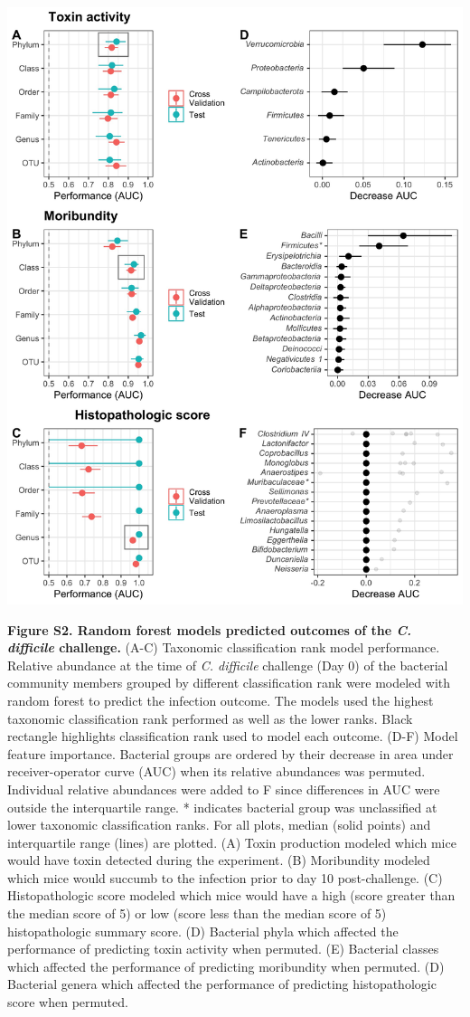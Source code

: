 \documentclass[
  12pt,
]{article}
\begin{document}
\hfill\break

\includegraphics{../results/figures/figure_S2.jpg}

\textbf{Figure S2. Random forest models predicted outcomes of the
\emph{C. difficile} challenge.} (A-C) Taxonomic classification rank
model performance. Relative abundance at the time of \emph{C. difficile}
challenge (Day 0) of the bacterial community members grouped by
different classification rank were modeled with random forest to predict
the infection outcome. The models used the highest taxonomic
classification rank performed as well as the lower ranks. Black
rectangle highlights classification rank used to model each outcome.
(D-F) Model feature importance. Bacterial groups are ordered by their
decrease in area under receiver-operator curve (AUC) when its relative
abundances was permuted. Individual relative abundances were added to F
since differences in AUC were outside the interquartile range. *
indicates bacterial group was unclassified at lower taxonomic
classification ranks. For all plots, median (solid points) and
interquartile range (lines) are plotted. (A) Toxin production modeled
which mice would have toxin detected during the experiment. (B)
Moribundity modeled which mice would succumb to the infection prior to
day 10 post-challenge. (C) Histopathologic score modeled which mice
would have a high (score greater than the median score of 5) or low
(score less than the median score of 5) histopathologic summary score.
(D) Bacterial phyla which affected the performance of predicting toxin
activity when permuted. (E) Bacterial classes which affected the
performance of predicting moribundity when permuted. (D) Bacterial
genera which affected the performance of predicting histopathologic
score when permuted.
\end{document}
